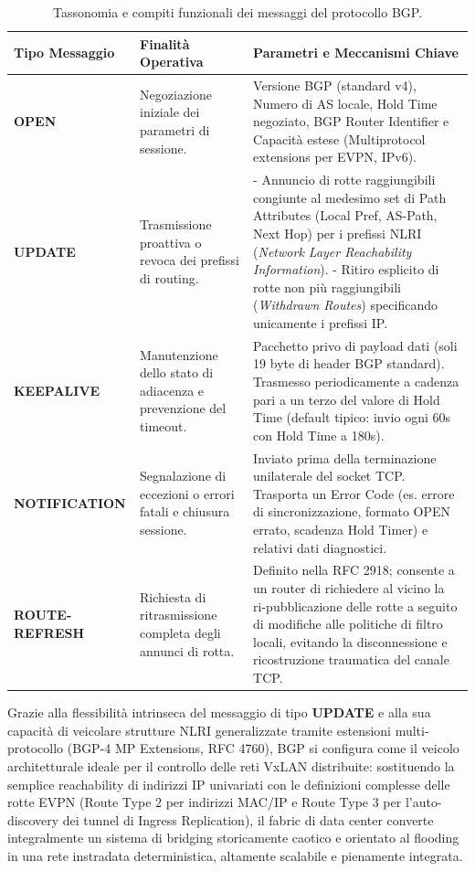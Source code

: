 \documentclass[11pt, a4paper]{article}
\begin{document}
\begin{table}[H]
    \centering
    \small
    \begin{tabularx}{\textwidth}{lp{4cm}X}
        \toprule
        \textbf{Tipo Messaggio} & \textbf{Finalità Operativa} & \textbf{Parametri e Meccanismi Chiave} \\
        \midrule
        \textbf{OPEN} & Negoziazione iniziale dei parametri di sessione. & Versione BGP (standard v4), Numero di AS locale, Hold Time negoziato, BGP Router Identifier e Capacità estese (Multiprotocol extensions per EVPN, IPv6). \\
        \addlinespace
        \textbf{UPDATE} & Trasmissione proattiva o revoca dei prefissi di routing. & - Annuncio di rotte raggiungibili congiunte al medesimo set di Path Attributes (Local Pref, AS-Path, Next Hop) per i prefissi NLRI (\emph{Network Layer Reachability Information}). \newline - Ritiro esplicito di rotte non più raggiungibili (\emph{Withdrawn Routes}) specificando unicamente i prefissi IP. \\
        \addlinespace
        \textbf{KEEPALIVE} & Manutenzione dello stato di adiacenza e prevenzione del timeout. & Pacchetto privo di payload dati (soli 19 byte di header BGP standard). Trasmesso periodicamente a cadenza pari a un terzo del valore di Hold Time (default tipico: invio ogni 60s con Hold Time a 180s). \\
        \addlinespace
        \textbf{NOTIFICATION} & Segnalazione di eccezioni o errori fatali e chiusura sessione. & Inviato prima della terminazione unilaterale del socket TCP. Trasporta un Error Code (es. errore di sincronizzazione, formato OPEN errato, scadenza Hold Timer) e relativi dati diagnostici. \\
        \addlinespace
        \textbf{ROUTE-REFRESH} & Richiesta di ritrasmissione completa degli annunci di rotta. & Definito nella RFC 2918; consente a un router di richiedere al vicino la ri-pubblicazione delle rotte a seguito di modifiche alle politiche di filtro locali, evitando la disconnessione e ricostruzione traumatica del canale TCP. \\
        \bottomrule
    \end{tabularx}
    \caption{Tassonomia e compiti funzionali dei messaggi del protocollo BGP.}
\end{table}

Grazie alla flessibilità intrinseca del messaggio di tipo \textbf{UPDATE} e alla sua capacità di veicolare strutture NLRI generalizzate tramite estensioni multi-protocollo (BGP-4 MP Extensions, RFC 4760), BGP si configura come il veicolo architetturale ideale per il controllo delle reti VxLAN distribuite: sostituendo la semplice reachability di indirizzi IP univariati con le definizioni complesse delle rotte EVPN (Route Type 2 per indirizzi MAC/IP e Route Type 3 per l'auto-discovery dei tunnel di Ingress Replication), il fabric di data center converte integralmente un sistema di bridging storicamente caotico e orientato al flooding in una rete instradata deterministica, altamente scalabile e pienamente integrata.
\end{document}
